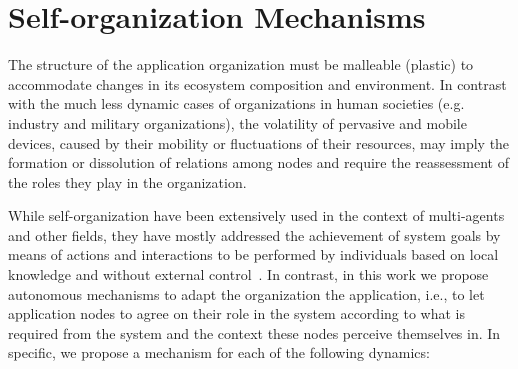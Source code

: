 \section{Self-organization Mechanisms}\label{sec:self_organization}




The structure of the application organization
must be malleable (plastic) to accommodate changes in its ecosystem composition and environment. In contrast with the much less dynamic cases of organizations in human societies (e.g. industry and military organizations), the volatility of pervasive and mobile devices, caused by their mobility or fluctuations of their resources, may imply the formation or dissolution of relations among nodes and require the reassessment of the roles they play in the organization. 

While self-organization have been extensively used in the context of multi-agents and other fields, they have mostly addressed the achievement of system goals by means of actions and interactions to be performed by individuals based on local knowledge and without external control~\cite{Banzhaf:2009}. In contrast, in this work we propose autonomous mechanisms to adapt the organization the application, i.e., to let application nodes to agree on their role in the system according to what is required from the system and the context these nodes perceive themselves in. In specific, we propose a mechanism for each of the following dynamics:


